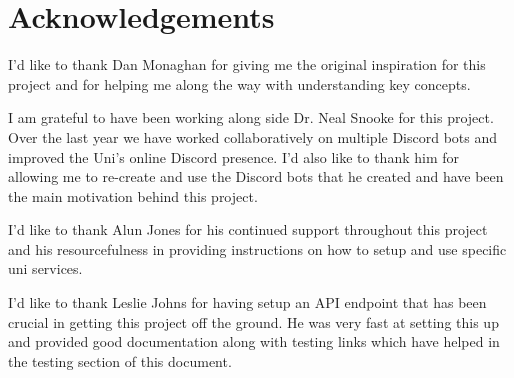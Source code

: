\thispagestyle{empty}


\section*{\centering Acknowledgements}

I'd like to thank Dan Monaghan for giving me the original inspiration for this project and for helping me along the way with understanding key concepts. 

I am grateful to have been working along side Dr. Neal Snooke for this project. Over the last year we have worked collaboratively on multiple Discord bots and improved the Uni's online Discord presence. I'd also like to thank him for allowing me to re-create and use the Discord bots that he created and have been the main motivation behind this project.

I'd like to thank Alun Jones for his continued support throughout this project and his resourcefulness in providing instructions on how to setup and use specific uni services.

I'd like to thank Leslie Johns for having setup an API endpoint that has been crucial in getting this project off the ground. He was very fast at setting this up and provided good documentation along with testing links which have helped in the testing section of this document.


